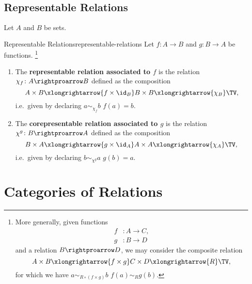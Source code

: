 \subsection{Representable Relations}\label{subsection-representable-relations}
Let $A$ and $B$ be sets.
\begin{definition}{Representable Relations}{representable-relations}%
    Let $f\colon A\to B$ and $g\colon B\to A$ be functions.%
    \footnote{%
        More generally, given functions
        \begin{align*}
            f &\colon A \to C,\\
            g &\colon B \to D
        \end{align*}
        and a relation $B\rightproarrow D$, we may consider the composite relation
        \[
            A\times B%
            \xlongrightarrow{f\times g}%
            C\times D%
            \xlongrightarrow{R}%
            \TV,%
        \]%
        for which we have $a\sim_{R\circ(f\times g)}b$ \textiff $f(a)\sim_{R}g(b)$.
        \par\vspace*{\TCBBoxCorrection}
    }%
    \begin{enumerate}
        \item\label{representable-relations-representable-relations}The \textbf{representable relation associated to $f$} is the relation $\chi_{f}\colon A\rightproarrow B$ defined as the composition%
            \[
                A\times B%
                \xlongrightarrow{f\times\id_{B}}%
                B\times B%
                \xlongrightarrow{\chi_{B}}%
                \TV,%
            \]%
            i.e.\ given by declaring $a\sim_{\chi_{f}}b$ \textiff $f(a)=b$.
        \item\label{representable-relations-corepresentable-relations}The \textbf{corepresentable relation associated to $g$} is the relation $\chi^{g}\colon B\rightproarrow A$ defined as the composition%
            \[
                B\times A%
                \xlongrightarrow{g\times\id_{A}}%
                A\times A%
                \xlongrightarrow{\chi_{A}}%
                \TV,%
            \]%
            i.e.\ given by declaring $b\sim_{\chi^{g}}a$ \textiff $g(b)=a$.
    \end{enumerate}
\end{definition}
\section{Categories of Relations}\label{subsection-categories-of-relations}
